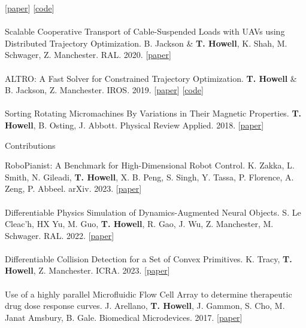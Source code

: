 \documentclass[10pt]{article}
\begin{document}
[\href{https://arxiv.org/abs/2010.08506v3}{paper}]
[\href{https://github.com/thowell/direct_policy_optimization}{code}]
\\
\\
Scalable Cooperative Transport of Cable-Suspended Loads with UAVs using Distributed Trajectory Optimization. B. Jackson \& \textbf{T. Howell}, K. Shah, M. Schwager, Z. Manchester. RAL. 2020. 
[\href{https://roboticexplorationlab.org/papers/distributed_quads.pdf}{paper}]
\\
\\
ALTRO: A Fast Solver for Constrained Trajectory Optimization. \textbf{T. Howell} \& B. Jackson, Z. Manchester. IROS. 2019. 
[\href{https://roboticexplorationlab.org/papers/altro-iros.pdf}{paper}]
[\href{https://github.com/RoboticExplorationLab/TrajectoryOptimization.jl}{code}]
\\
\\
Sorting Rotating Micromachines By Variations in Their Magnetic Properties. \textbf{T. Howell}, B. Osting, J. Abbott. Physical Review Applied. 2018. 
[\href{https://journals.aps.org/prapplied/pdf/10.1103/PhysRevApplied.9.054021}{paper}]
\\
\begin{center} Contributions \end{center}
RoboPianist: A Benchmark for High-Dimensional Robot Control. K. Zakka, L. Smith, N. Gileadi, \textbf{T. Howell}, X. B. Peng, S. Singh, Y. Tassa, P. Florence, A. Zeng, P. Abbeel. arXiv. 2023. 
[\href{https://arxiv.org/abs/2304.04150}{paper}]
\\
\\
Differentiable Physics Simulation of Dynamics-Augmented Neural Objects. S. Le Cleac'h, HX Yu, M. Guo, \textbf{T. Howell}, R. Gao, J. Wu, Z. Manchester, M. Schwager. RAL. 2022. 
[\href{https://arxiv.org/pdf/2210.09420.pdf}{paper}]
\\
\\
Differentiable Collision Detection for a Set of Convex Primitives. K. Tracy, \textbf{T. Howell}, Z. Manchester. ICRA. 2023.
[\href{https://arxiv.org/abs/2207.00669}{paper}]
\\
\\
Use of a highly parallel Microfluidic Flow Cell Array to determine therapeutic drug dose response curves. J. Arellano, \textbf{T. Howell}, J. Gammon, S. Cho, M. Janat Amsbury, B. Gale. Biomedical Microdevices. 2017. 
[\href{https://link.springer.com/article/10.1007/s10544-017-0166-3}{paper}]
\end{document}
